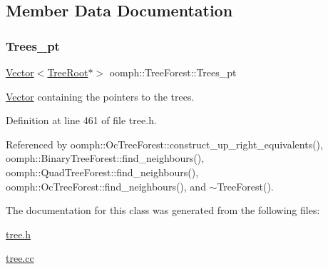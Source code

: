 \subsection{Member Data Documentation}
\mbox{\label{classoomph_1_1TreeForest_a94d44c85e121758945f04aa28aa8df2a}} 
\subsubsection{\texorpdfstring{Trees\+\_\+pt}{Trees\_pt}}
{\footnotesize\ttfamily \hyperlink{classoomph_1_1Vector}{Vector}$<$\hyperlink{classoomph_1_1TreeRoot}{Tree\+Root}$\ast$$>$ oomph\+::\+Tree\+Forest\+::\+Trees\+\_\+pt\hspace{0.3cm}{\ttfamily [protected]}}



\hyperlink{classoomph_1_1Vector}{Vector} containing the pointers to the trees. 



Definition at line 461 of file tree.\+h.



Referenced by oomph\+::\+Oc\+Tree\+Forest\+::construct\+\_\+up\+\_\+right\+\_\+equivalents(), oomph\+::\+Binary\+Tree\+Forest\+::find\+\_\+neighbours(), oomph\+::\+Quad\+Tree\+Forest\+::find\+\_\+neighbours(), oomph\+::\+Oc\+Tree\+Forest\+::find\+\_\+neighbours(), and $\sim$\+Tree\+Forest().



The documentation for this class was generated from the following files\+:\begin{DoxyCompactItemize}
\item 
\hyperlink{tree_8h}{tree.\+h}\item 
\hyperlink{tree_8cc}{tree.\+cc}\end{DoxyCompactItemize}
